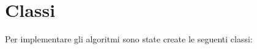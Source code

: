 \section{Classi}
\label{Classi}

Per implementare gli algoritmi sono state create le seguenti classi:


\newpage